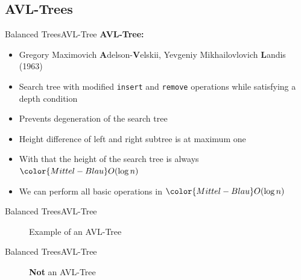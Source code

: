 \subsection{AVL-Trees}

\begin{frame}{Balanced Trees}{AVL-Tree}
  \textbf{AVL-Tree:}
  \begin{itemize}
    \item<2->
      Gregory Maximovich \textbf{A}delson-\textbf{V}elskii, Yevgeniy Mikhailovlovich \textbf{L}andis (1963)
    \item<3->
      Search tree with modified \texttt{\color{Mittel-Blau}insert} and
      \texttt{\color{Mittel-Blau}remove} operations while satisfying
      a {\color{Mittel-Blau}depth} condition
    \item<4->
      Prevents degeneration of the search tree
    \item<5->
      Height difference of left and right subtree is at maximum one
    \item<6->
      With that the height of the search tree is always
      ${\color{Mittel-Blau}O(\log n)}$
    \item<7->
      We can perform all basic operations in
      ${\color{Mittel-Blau}O(\log n)}$
  \end{itemize}
\end{frame}


\begin{frame}{Balanced Trees}{AVL-Tree}
  \begin{figure}
    \begin{adjustbox}{width=0.75\linewidth}
      
    \end{adjustbox}
    \caption{Example of an AVL-Tree}
    \label{fig:balanced_trees:avl_tree_example1}
  \end{figure}
\end{frame}


\begin{frame}{Balanced Trees}{AVL-Tree}
  \begin{figure}
    \begin{adjustbox}{width=0.75\linewidth}
      
    \end{adjustbox}
    \caption{\textbf{Not} an AVL-Tree}
    \label{fig:balanced_trees:avl_tree_example2}
  \end{figure}
\end{frame}

